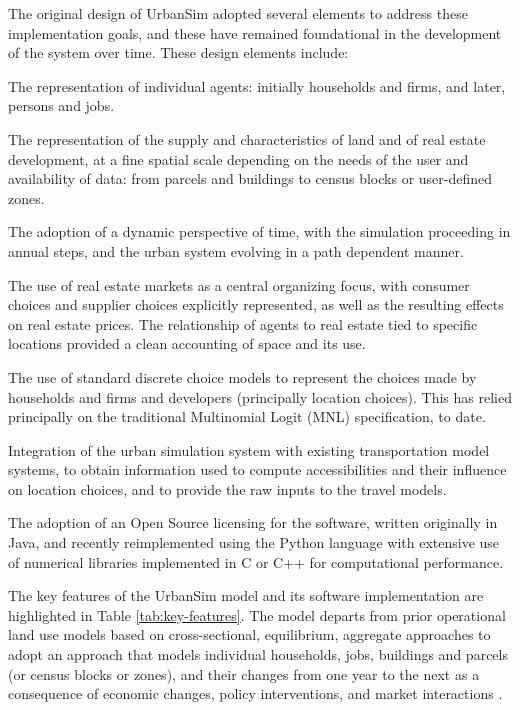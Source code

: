 \bigskip
The original design of UrbanSim adopted several elements to address these implementation goals, and these have remained foundational in the development of the system over time.  These design elements include:

\squishlist
\item The representation of individual agents: initially households and firms, and later, persons and jobs.
\item The representation of the supply and characteristics of land and of real estate development, at a fine spatial scale depending on the needs of the user and availability of data: from parcels and buildings to census blocks or user-defined zones.
\item   The adoption of a dynamic perspective of time, with the simulation proceeding in annual steps, and the urban system evolving in a path dependent manner.
\item   The use of real estate markets as a central organizing focus, with consumer choices and supplier choices explicitly represented, as well as the resulting effects on real estate prices.  The relationship of agents to real estate tied to specific locations provided a clean accounting of space and its use.
\item   The use of standard discrete choice models to represent the choices made by households and firms and developers (principally location choices).  This has relied principally on the traditional Multinomial Logit (MNL) specification, to date.
\item   Integration of the urban simulation system with existing transportation model systems, to obtain information used to compute accessibilities and their influence on location choices, and to provide the raw inputs to the travel models.
\item   The adoption of an Open Source licensing for the software, written originally in Java, and recently reimplemented using the Python language with extensive use of numerical libraries implemented in C or C++ for computational performance.
\squishend

\bigskip
The key features of the UrbanSim model and its software implementation are highlighted in Table \ref{tab:key-features}.  The model departs from prior operational land use models based on cross-sectional, equilibrium, aggregate approaches to adopt an approach that models individual households, jobs, buildings and parcels (or census blocks or zones), and their changes from one year to the next as a consequence of economic changes, policy interventions, and market interactions .

